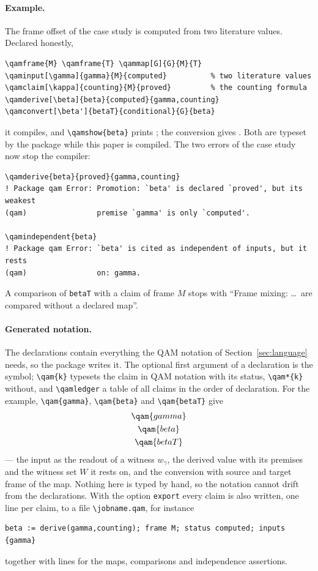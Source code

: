 \paragraph{Example.}  The frame offset of the case study is computed from two literature values.  Declared honestly,
\begin{lstlisting}
\qamframe{M} \qamframe{T} \qammap[G]{G}{M}{T}
\qaminput[\gamma]{gamma}{M}{computed}          % two literature values
\qamclaim[\kappa]{counting}{M}{proved}         % the counting formula
\qamderive[\beta]{beta}{computed}{gamma,counting}
\qamconvert[\beta']{betaT}{conditional}{G}{beta}
\end{lstlisting}
%
%
%
it compiles, and \verb|\qamshow{beta}| prints ; the conversion gives .  Both are typeset by the package
while this paper is compiled.  The two errors of the case study now stop the compiler:
\begin{lstlisting}
\qamderive{beta}{proved}{gamma,counting}
! Package qam Error: Promotion: `beta' is declared `proved', but its weakest
(qam)                premise `gamma' is only `computed'.

\qamindependent{beta}
! Package qam Error: `beta' is cited as independent of inputs, but it rests
(qam)                on: gamma.
\end{lstlisting}
A comparison of \texttt{betaT} with a claim of frame \(M\) stops with ``Frame mixing: \dots\ are compared without a declared map''.

\paragraph{Generated notation.}  The declarations contain everything the QAM notation of Section~\ref{sec:language} needs, so the package
writes it.  The optional first argument of a declaration is the symbol; \verb|\qam{k}| typesets the claim in QAM notation with its status,
\verb|\qam*{k}| without, and \verb|\qamledger| a table of all claims in the order of declaration.  For the example, \verb|\qam{gamma}|,
\verb|\qam{beta}| and \verb|\qam{betaT}| give
\begin{gather*}
\qam{gamma}\\
\qam{beta}\\
\qam{betaT}
\end{gather*}
--- the input as the readout of a witness \(w_\gamma\), the derived value with its premises and the witness set \(W\) it rests on, and the
conversion with source and target frame of the map.  Nothing here is typed by hand, so the notation cannot drift from the declarations.
With the option \verb|export| every claim is also written, one line per claim, to a file \verb|\jobname.qam|, for instance
\begin{lstlisting}
beta := derive(gamma,counting); frame M; status computed; inputs {gamma}
\end{lstlisting}
together with lines for the maps, comparisons and independence assertions.

